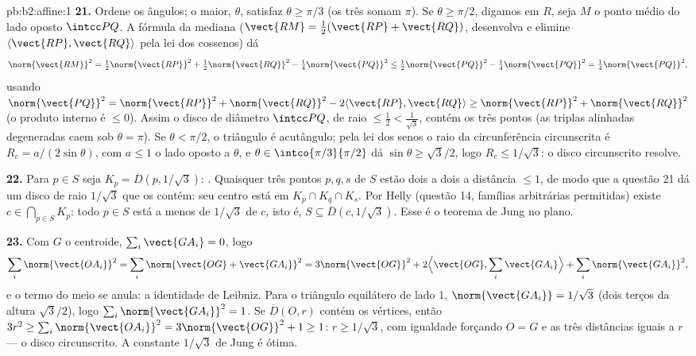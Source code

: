 \begin{solution}{pb:b2:affine:1}
\textbf{21.} Ordene os ângulos; o maior, $\theta$,
satisfaz $\theta \geq \pi/3$ (os três somam $\pi$). Se
$\theta \geq \pi/2$, digamos em $R$, seja $M$ o ponto médio do
lado oposto $\intcc PQ$. A fórmula da mediana ($\vect{RM}
= \tfrac12(\vect{RP} + \vect{RQ})$, desenvolva e elimine
$\langle\vect{RP}, \vect{RQ}\rangle$ pela lei dos cossenos)
dá
\[
\norm{\vect{RM}}^2 = \tfrac12\norm{\vect{RP}}^2 +
\tfrac12\norm{\vect{RQ}}^2 - \tfrac14\norm{\vect{PQ}}^2 \leq
\tfrac12\norm{\vect{PQ}}^2 - \tfrac14\norm{\vect{PQ}}^2 =
\tfrac14\norm{\vect{PQ}}^2,
\]
usando $\norm{\vect{PQ}}^2 = \norm{\vect{RP}}^2 +
\norm{\vect{RQ}}^2 - 2\langle\vect{RP}, \vect{RQ}\rangle \geq
\norm{\vect{RP}}^2 + \norm{\vect{RQ}}^2$ (o produto interno
é $\leq 0$). Assim o disco de diâmetro $\intcc PQ$, de raio
$\leq \tfrac12 < \tfrac1{\sqrt3}$, contém os três pontos
(as triplas alinhadas degeneradas caem sob $\theta = \pi$). Se
$\theta < \pi/2$, o triângulo é acutângulo; pela lei dos senos
o raio da circunferência circunscrita é $R_c = a/(2\sin\theta)$, com $a \leq 1$
o lado oposto a $\theta$, e $\theta \in
\intco{\pi/3}{\pi/2}$ dá $\sin\theta \geq \sqrt3/2$, logo
$R_c \leq 1/\sqrt3$: o disco circunscrito resolve.

\textbf{22.} Para $p \in S$ seja $K_p = \overline D(p,
1/\sqrt3)$:  . Quaisquer três pontos $p, q, s$ de $S$
estão dois a dois a distância $\leq 1$, de modo que a questão 21 dá um
disco de raio $1/\sqrt3$ que os contém: seu centro está em
$K_p \cap K_q \cap K_s$. Por Helly  (questão 14,
famílias arbitrárias permitidas) existe $c \in \bigcap_{p\in
S}K_p$: todo $p \in S$ está a menos de $1/\sqrt3$ de $c$, isto é, $S
\subseteq \overline D(c, 1/\sqrt3)$. Esse é o teorema de Jung
no plano.

\textbf{23.} Com $G$ o centroide, $\sum_i\vect{GA_i} = 0$,
logo
\[
\sum_i\norm{\vect{OA_i}}^2 = \sum_i\norm{\vect{OG} +
\vect{GA_i}}^2 = 3\norm{\vect{OG}}^2 + 2\Bigl\langle
\vect{OG}, \sum_i\vect{GA_i}\Bigr\rangle +
\sum_i\norm{\vect{GA_i}}^2,
\]
e o termo do meio se anula: a identidade de Leibniz. Para o
triângulo equilátero de lado $1$, $\norm{\vect{GA_i}} =
1/\sqrt3$ (dois terços da altura $\sqrt3/2$), logo
$\sum_i\norm{\vect{GA_i}}^2 = 1$. Se $\overline D(O, r)$
contém os vértices, então $3r^2 \geq
\sum_i\norm{\vect{OA_i}}^2 = 3\norm{\vect{OG}}^2 + 1 \geq 1$:
$r \geq 1/\sqrt3$, com igualdade forçando $O = G$ e as três
distâncias iguais a $r$ --- o disco circunscrito. A constante
$1/\sqrt3$ de Jung é ótima.


\end{solution}
